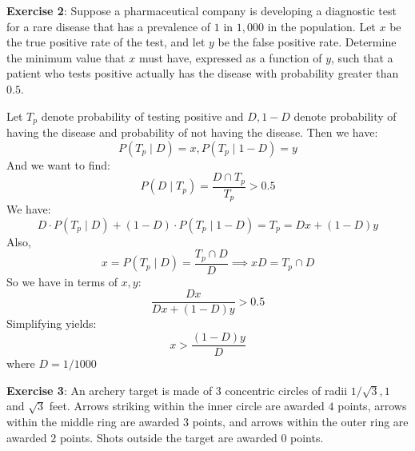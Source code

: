 \documentclass{article}
\begin{document}
    \textbf{Exercise 2}: Suppose a pharmaceutical company is developing a diagnostic test for a rare disease that has a prevalence of $1$ in $1,000$ in the population. Let $x$ be the true positive rate of the test, and let $y$ be the false positive rate. Determine the minimum value that $x$ must have, expressed as a function of $y$, such that a patient who tests positive actually has the disease with probability greater than $0.5$.
        \begin{answer}
            Let $T_{p}$ denote probability of testing positive and $D, 1 - D$ denote probability of having the disease and probability of not having the disease. Then we have:
                \begin{equation*}
                    P(T_{p} \mid D) = x, P(T_{p} \mid 1 - D) = y
                \end{equation*}
            And we want to find:
                \begin{equation*}
                    P(D \mid T_{p}) = \dfrac{D \cap T_{p}}{T_{p}} > 0.5
                \end{equation*}
            We have:
                \begin{equation*}
                    D \cdot P(T_{p} \mid D) + (1 - D) \cdot P(T_{p} \mid 1 - D) = T_{p} = Dx + (1 - D)y
                \end{equation*}
            Also, 
                \begin{equation*}
                    x = P(T_{p} \mid D) = \dfrac{T_{p} \cap D}{D} \implies xD = T_{p} \cap D
                \end{equation*}
            So we have in terms of $x, y$:
                \begin{equation*}
                    \dfrac{Dx}{Dx + (1 - D)y} > 0.5
                \end{equation*}
            Simplifying yields:
                \begin{equation*}
                    x > \dfrac{(1 - D)y}{D}
                \end{equation*}
            where $D = 1/1000$
        \end{answer}

    \textbf{Exercise 3}: An archery target is made of $3$ concentric circles of radii $1/\sqrt{3}, 1$ and $\sqrt{3}$ feet. Arrows striking within the inner circle are awarded $4$ points, arrows within the middle ring are awarded $3$ points, and arrows within the outer ring are awarded $2$ points. Shots outside the target are awarded $0$ points.
\end{document}
